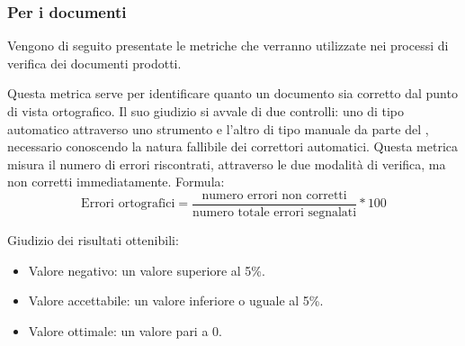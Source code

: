 \documentclass[a4paper, titlepage]{article}
\begin{document}
\subsubsection{Per i documenti}
Vengono di seguito presentate le metriche che verranno utilizzate nei processi di verifica dei documenti prodotti.

\label{par:errort}
Questa metrica serve per identificare quanto un documento sia corretto dal punto di vista ortografico. Il suo giudizio si avvale di due controlli: uno di tipo automatico attraverso uno strumento  e l'altro di tipo manuale da parte del , necessario conoscendo la natura fallibile dei correttori automatici.
\newline Questa metrica misura il numero di errori riscontrati, attraverso le due modalità di verifica, ma non corretti immediatamente.
\newline Formula:
\begin{displaymath}
\mbox{Errori ortografici}= \frac{\mbox{numero errori non corretti}}{\mbox{numero totale errori segnalati}}*100
\end{displaymath}
\par Giudizio dei risultati ottenibili:
\begin{itemize}
\item Valore negativo: un valore superiore al 5\%. 
\item Valore accettabile: un valore inferiore o uguale al 5\%.
\item Valore ottimale: un valore pari a 0.
\end{itemize}
\end{document}
